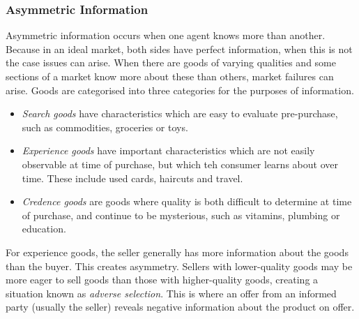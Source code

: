\documentclass[12pt]{report}
\begin{document}
\begin{flushleft}
\subsubsection*{Asymmetric Information}
Asymmetric information occurs when one agent knows more than another.
Because in an ideal market, both sides have perfect information, when
this is not the case issues can arise. When there are goods of varying
qualities and some sections of a market know more about these than others, 
market failures can arise. Goods are categorised into three categories
for the purposes of information.
\begin{itemize}
    \item \textit{Search goods} have characteristics which are easy to
    evaluate pre-purchase, such as commodities, groceries or toys.
    \item \textit{Experience goods} have important characteristics which
    are not easily observable at time of purchase, but which teh consumer
    learns about over time. These include used cards, haircuts and travel.
    \item \textit{Credence goods} are goods where quality is both difficult
    to determine at time of purchase, and continue to be mysterious, such as
    vitamins, plumbing or education.
\end{itemize}
For experience goods, the seller generally has more information about the
goods than the buyer. This creates asymmetry. Sellers with lower-quality 
goods may be more eager to sell goods than those with higher-quality goods,
creating a situation known as \textit{adverse selection}. This is where an
offer from an informed party (usually the seller) reveals negative information
about the product on offer.


\end{flushleft}
\end{document}

